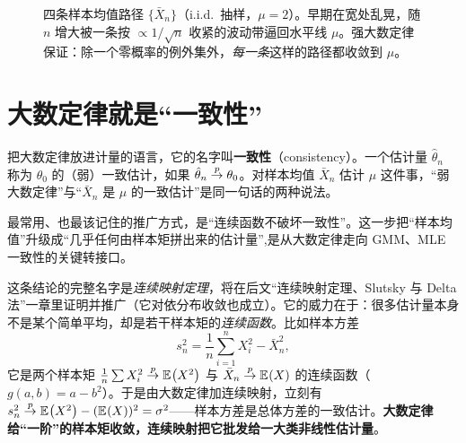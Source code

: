 \begin{figure}[h]
\caption{四条样本均值路径 $\{\bar X_n\}$（i.i.d.\ 抽样，$\mu=2$）。早期在宽处乱晃，随 $n$ 增大被一条按 $\propto 1/\sqrt n$ 收紧的波动带逼回水平线 $\mu$。强大数定律保证：除一个零概率的例外集外，\emph{每一条}这样的路径都收敛到 $\mu$。}
\label{fig:lln-2}
\end{figure}

\section{大数定律就是``一致性''}
\label{sec:lln-consistency}

把大数定律放进计量的语言，它的名字叫\textbf{一致性}（consistency）。一个估计量 $\hat\theta_n$ 称为 $\theta_0$ 的（弱）一致估计，如果 $\hat\theta_n\overset{p}{\to}\theta_0$。对样本均值 $\bar X_n$ 估计 $\mu$ 这件事，``弱大数定律''与``$\bar X_n$ 是 $\mu$ 的一致估计''是同一句话的两种说法。


最常用、也最该记住的推广方式，是``连续函数不破坏一致性''。这一步把``样本均值''升级成``几乎任何由样本矩拼出来的估计量'',是从大数定律走向 GMM、MLE 一致性的关键转接口。


这条结论的完整名字是\emph{连续映射定理}，将在后文``连续映射定理、Slutsky 与 Delta 法''一章里证明并推广（它对依分布收敛也成立）。它的威力在于：很多估计量本身不是某个简单平均，却是若干样本矩的\emph{连续函数}。比如样本方差
\[
    s_n^2=\frac1n\sum_{i=1}^n X_i^2-\bar X_n^2 ,
\]
它是两个样本矩 $\frac1n\sum X_i^2\overset{p}{\to}\mathbb{E}_{}\!\left(X^2\right)$ 与 $\bar X_n\overset{p}{\to}\mathbb{E}_{}\!\left(X\right)$ 的连续函数（$g(a,b)=a-b^2$）。于是由大数定律加连续映射，立刻有 $s_n^2\overset{p}{\to}\mathbb{E}_{}\!\left(X^2\right)-(\mathbb{E}_{}\!\left(X\right))^2=\sigma^2$——样本方差是总体方差的一致估计。\textbf{大数定律给``一阶''的样本矩收敛，连续映射把它批发给一大类非线性估计量}。

